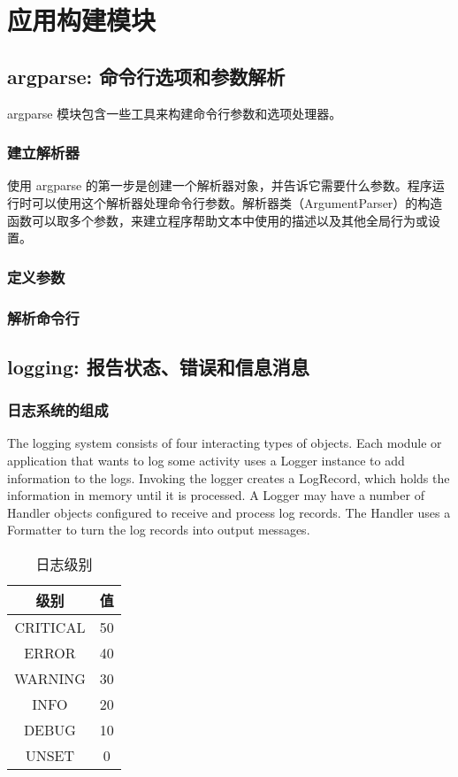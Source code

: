 \chapter{应用构建模块\label{ch14}}
\section{argparse: 命令行选项和参数解析}
argparse 模块包含一些工具来构建命令行参数和选项处理器。
\subsection{建立解析器}
使用 argparse 的第一步是创建一个解析器对象，并告诉它需要什么参数。程序运行时可以使用这个解析器处理命令行参数。解析器类（ArgumentParser）的构造函数可以取多个参数，来建立程序帮助文本中使用的描述以及其他全局行为或设置。
\subsection{定义参数}
\subsection{解析命令行}
\section{logging: 报告状态、错误和信息消息}
\subsection{日志系统的组成}
The logging system consists of four interacting types of objects. Each module or application that wants to log some activity uses a Logger instance to add information to the logs. Invoking the logger creates a LogRecord, which holds the information in memory until it is processed. A Logger may have a number of Handler objects configured to receive and process log records. The Handler uses a Formatter to turn the log records into output messages.

\begin{table}
    \centering
    \caption{日志级别}
    \label{loggingLevel}
    \begin{tabular}{cc}
        \hline
        级别       & 值  \\
        \hline
        CRITICAL & 50 \\
        ERROR    & 40 \\
        WARNING  & 30 \\
        INFO     & 20 \\
        DEBUG    & 10 \\
        UNSET    & 0  \\
        \hline
    \end{tabular}
\end{table}
